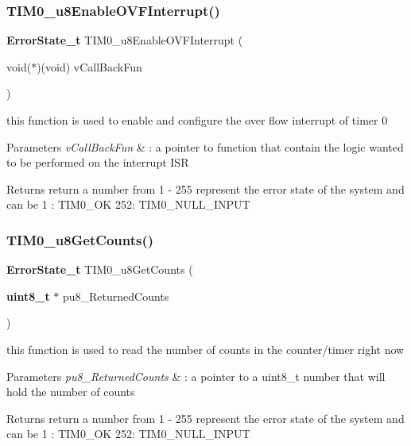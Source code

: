 \subsubsection{T\+I\+M0\+\_\+u8\+Enable\+O\+V\+F\+Interrupt()}
{\footnotesize\ttfamily \textbf{ Error\+State\+\_\+t} T\+I\+M0\+\_\+u8\+Enable\+O\+V\+F\+Interrupt (\begin{DoxyParamCaption}\item[{void($\ast$)(void)}]{v\+Call\+Back\+Fun }\end{DoxyParamCaption})}



this function is used to enable and configure the over flow interrupt of timer 0 


\begin{DoxyParams}{Parameters}
{\em v\+Call\+Back\+Fun} & \+: a pointer to function that contain the logic wanted to be performed on the interrupt I\+SR \\
\hline
\end{DoxyParams}
\begin{DoxyReturn}{Returns}
return a number from 1 -\/ 255 represent the error state of the system and can be 1 \+: T\+I\+M0\+\_\+\+OK 252\+: T\+I\+M0\+\_\+\+N\+U\+L\+L\+\_\+\+I\+N\+P\+UT 
\end{DoxyReturn}
\mbox{\label{_t_i_m_e_r0__interface_8h_affaf298d5dadbb9ea2c5b0782b49b30c}} 
\subsubsection{T\+I\+M0\+\_\+u8\+Get\+Counts()}
{\footnotesize\ttfamily \textbf{ Error\+State\+\_\+t} T\+I\+M0\+\_\+u8\+Get\+Counts (\begin{DoxyParamCaption}\item[{\textbf{ uint8\+\_\+t} $\ast$}]{pu8\+\_\+\+Returned\+Counts }\end{DoxyParamCaption})}



this function is used to read the number of counts in the counter/timer right now 


\begin{DoxyParams}{Parameters}
{\em pu8\+\_\+\+Returned\+Counts} & \+: a pointer to a uint8\+\_\+t number that will hold the number of counts \\
\hline
\end{DoxyParams}
\begin{DoxyReturn}{Returns}
return a number from 1 -\/ 255 represent the error state of the system and can be 1 \+: T\+I\+M0\+\_\+\+OK 252\+: T\+I\+M0\+\_\+\+N\+U\+L\+L\+\_\+\+I\+N\+P\+UT 
\end{DoxyReturn}
\mbox{\label{_t_i_m_e_r0__interface_8h_a7411543d6d0d589f6b5fa318bcf59d88}} 
